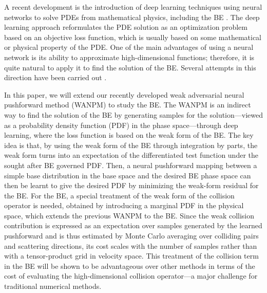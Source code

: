 \documentclass[11pt]{article}
\theoremstyle{plain}
\begin{document}
A recent development is the introduction of deep learning techniques using neural networks to solve PDEs from mathematical physics, including the BE \cite{raissi2019physics,yu2018deep,sirignano2018dgm,zang2020weak}. The deep learning approach reformulates the PDE solution as an optimization problem based on an objective loss function, which is usually based on some mathematical or physical property of the PDE. One of the main advantages of using a neural network is its ability to approximate high-dimensional functions; therefore, it is quite natural to apply it to find the solution of the BE. Several attempts in this direction have been carried out \cite{han2019uniformly,schotthofer2022structure,xiao2021using}.

In this paper, we will extend our recently developed weak adversarial neural pushforward method (WANPM) \cite{he2025learning,he2026weakFP,he2026weakMFP} to study the BE.
The WANPM is an indirect way to find the solution of the BE by generating samples for the solution---viewed as a probability density function (PDF) in the phase space---through deep learning, where the loss function is based on the weak form of the BE. The key idea is that, by using the weak form of the BE through integration by parts, the weak form turns into an expectation of the differentiated test function under the sought after BE governed PDF. Then, a  neural pushforward mapping between a simple base distribution in the base space and the desired BE phase space can then be learnt to give the desired PDF by minimizing the weak-form residual for the BE. For the BE, a special treatment of the weak form of the collision operator is needed, obtained by introducing a marginal PDF in the physical space, which extends the previous WANPM to the BE. Since the weak collision contribution is expressed as an expectation over samples generated by the learned pushforward and is thus estimated by Monte Carlo averaging over colliding pairs and scattering directions, its cost scales with the number of samples rather than with a tensor-product grid in velocity space. This treatment of the collision term in the BE will be shown to be advantageous over other methods in terms of the cost of evaluating the high-dimensional collision operator—a major challenge for traditional numerical methods.
\end{document}
